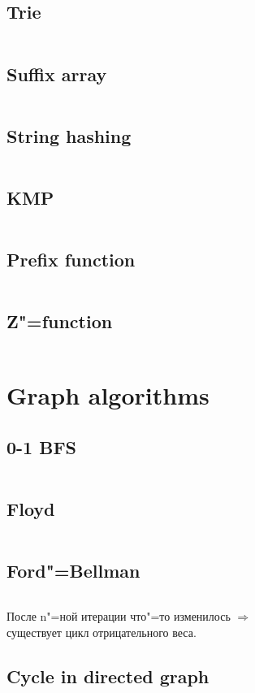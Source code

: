 ﻿\documentclass[a4paper,10pt,twocolumn,oneside]{article}
\begin{document}
\subsection{Trie}
\inputminted[breaklines]{cpp}{String algorithms/trie.cpp}
\subsection{Suffix array}
\inputminted[breaklines]{cpp}{String algorithms/suffix array.cpp}
\subsection{String hashing}
\inputminted[breaklines]{cpp}{String algorithms/string hashing.cpp}
\subsection{KMP}
\inputminted[breaklines]{python}{String algorithms/kmp.py}
\subsection{Prefix function}
\inputminted[breaklines]{python}{String algorithms/prefix-function.py}
\subsection{Z"=function}
\inputminted[breaklines]{python}{String algorithms/z-function.py}

\section{Graph algorithms}
\subsection{0-1 BFS}
\inputminted[breaklines]{cpp}{Graph algorithms/0-1 bfs.cpp}
\subsection{Floyd}
\inputminted[breaklines]{cpp}{Graph algorithms/floyd.cpp}
\subsection{Ford"=Bellman}
\inputminted[breaklines]{python}{Graph algorithms/ford-bellman.py}
После n"=ной итерации что"=то изменилось $\Rightarrow$ \\
существует цикл отрицательного веса.
\subsection{Cycle in directed graph}
\inputminted[breaklines]{cpp}{Graph algorithms/cycle in directed graph.cpp}
\end{document}
